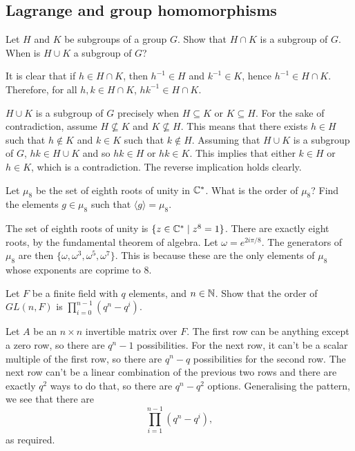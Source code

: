 \subsection{Lagrange and group homomorphisms}
\begin{questions}
  \begin{question}
    Let \(H\) and \(K\) be subgroups of a group \(G\). Show that \(H \cap K\) is a subgroup of \(G\). When is \(H \cup K\) a subgroup of \(G\)?
  \end{question}

  \begin{solution}
    It is clear that if \(h \in H \cap K\), then \(h^{-1} \in H\) and \(k^{-1} \in K\), hence \(h^{-1} \in H \cap K\). Therefore, for all \(h, k \in H \cap K\), \(hk^{-1} \in H \cap K\).

    \(H \cup K\) is a subgroup of \(G\) precisely when \(H \subseteq K\) or \(K \subseteq H\). For the sake of contradiction, assume \(H \not\subseteq K\) and \(K \not\subseteq H\). This means that there exists \(h \in H\) such that \(h \not\in K\) and \(k \in K\) such that \(k \not\in H\). Assuming that \(H \cup K\) is a subgroup of \(G\), \(hk \in H \cup K\) and so \(hk \in H\) or \(hk \in K\). This implies that either \(k \in H\) or \(h \in K\), which is a contradiction. The reverse implication holds clearly.
  \end{solution}

  \begin{question}
    Let \(\mu_{8}\) be the set of eighth roots of unity in \(\mathbb{C}^{*}\). What is the order of \(\mu_{8}\)? Find the elements \(g \in \mu_{8}\) such that \(\langle g \rangle = \mu_{8}\).
  \end{question}

  \begin{solution}
    The set of eighth roots of unity is \(\{z \in \mathbb{C}^{*} \mid z^{8} = 1\}\). There are exactly eight roots, by the fundamental theorem of algebra. Let \(\omega = e^{2i\pi/8}\). The generators of \(\mu_8\) are then \(\{\omega, \omega^{3}, \omega^{5}, \omega^{7}\}\). This is because these are the only elements of \(\mu_{8}\) whose exponents are coprime to \(8\).
  \end{solution}

  \begin{question}
    Let \(F\) be a finite field with \(q\) elements, and \(n \in \mathbb{N}\). Show that the order of \(GL(n, F)\) is \(\prod_{i = 0}^{n-1}(q^{n} - q^{i})\).
  \end{question}

  \begin{solution}
    Let \(A\) be an \(n \times n\) invertible matrix over \(F\). The first row can be anything except a zero row, so there are \(q^{n} - 1\) possibilities. For the next row, it can't be a scalar multiple of the first row, so there are \(q^{n} - q\) possibilities for the second row. The next row can't be a linear combination of the previous two rows and there are exactly \(q^{2}\) ways to do that, so there are \(q^{n} - q^{2}\) options. Generalising the pattern, we see that there are
    \[\prod_{i = 1}^{n-1} (q^{n} - q ^{i}),\]
    as required.
  \end{solution}
\end{questions}

